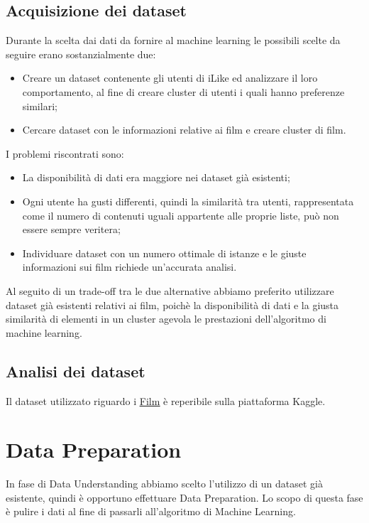 \documentclass[a4paper, 10pt]{report}
\begin{document}
    \section{Acquisizione dei dataset}\label{sec:acquisizione-dei-dataset}
    Durante la scelta dai dati da fornire al machine learning le possibili scelte da seguire erano sostanzialmente due:
    \begin{itemize}
        \item Creare un dataset contenente gli utenti di iLike ed analizzare il loro comportamento, al fine di creare
        cluster di utenti i quali hanno preferenze similari;
        \item Cercare dataset con le informazioni relative ai film e creare cluster di film.
    \end{itemize}

    I problemi riscontrati sono:
    \begin{itemize}
        \item La disponibilità di dati era maggiore nei dataset già esistenti;
        \item Ogni utente ha gusti differenti, quindi la similarità tra utenti, rappresentata come il numero di contenuti uguali
        appartente alle proprie liste, può non essere sempre veritera;
        \item Individuare dataset con un numero ottimale di istanze e le giuste informazioni sui film richiede
        un'accurata analisi.
    \end{itemize}
    Al seguito di un trade-off tra le due alternative abbiamo preferito utilizzare dataset già esistenti relativi ai film,
    poichè la disponibilità di dati e la giusta similarità di elementi in un cluster agevola le prestazioni dell'algoritmo
    di machine learning.

    \section{Analisi dei dataset}\label{sec:analisi-dei-dataset}
    Il dataset utilizzato riguardo i \href{https://www.kaggle.com/datasets/stefanoleone992/filmtv-movies-dataset?resource=download}{\underline{Film}}
    è reperibile sulla piattaforma Kaggle.


    \chapter{Data Preparation}\label{ch:data-preparation}
    In fase di Data Understanding abbiamo scelto l'utilizzo di un dataset già esistente, quindi è opportuno effettuare Data Preparation.
    Lo scopo di questa fase è pulire i dati al fine di passarli all'algoritmo di Machine Learning.
\end{document}
